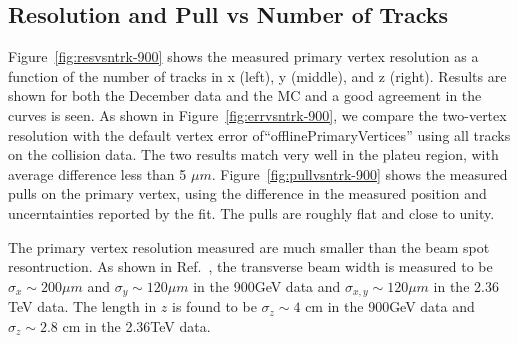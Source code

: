 \subsection{Resolution and Pull vs Number of Tracks}
\label{sub:900respull}

Figure~\ref{fig:resvsntrk-900} shows the measured primary vertex 
resolution as a function of the number of tracks in x (left), 
y (middle), and z (right). 
Results are shown for both the December data and the MC and 
a good agreement in the curves is seen. 
As shown in Figure~\ref{fig:errvsntrk-900}, we 
compare the two-vertex resolution with the default vertex 
error of``offlinePrimaryVertices'' using all tracks on the 
collision data. 
The two results match very well in the plateu region, with 
average difference less than 5 $\mu m$. 
Figure~\ref{fig:pullvsntrk-900} shows the measured pulls on the 
primary vertex, using the difference in the measured position and 
uncerntainties reported by the fit. 
The pulls are roughly flat and close to unity.

The primary vertex resolution measured are much smaller than the beam spot resontruction. 
As shown in Ref.~\cite{trk-10-001}, the transverse beam width is 
measured to be $\sigma_x \sim 200\mu m$ and $\sigma_y \sim 120\mu m$ 
in the 900GeV data and $\sigma_{x,y}\sim 120\mu m$ in the 
2.36 TeV data. The length in $z$ is found to be 
$\sigma_z\sim 4$ cm in the 900GeV data and $\sigma_z\sim 2.8$ cm in 
the 2.36TeV data.

